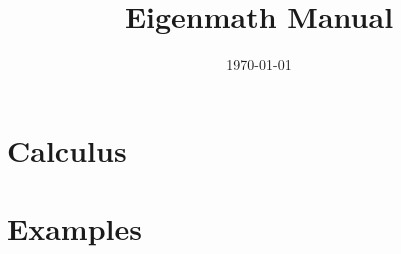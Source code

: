 \documentclass[11pt]{article}
\title{Eigenmath Manual}
\date{\today}
\begin{document}
\maketitle

\newpage

\tableofcontents

\newpage



\newpage


















\section{Calculus}












\section{Examples}










\newpage



\printindex
\end{document}
